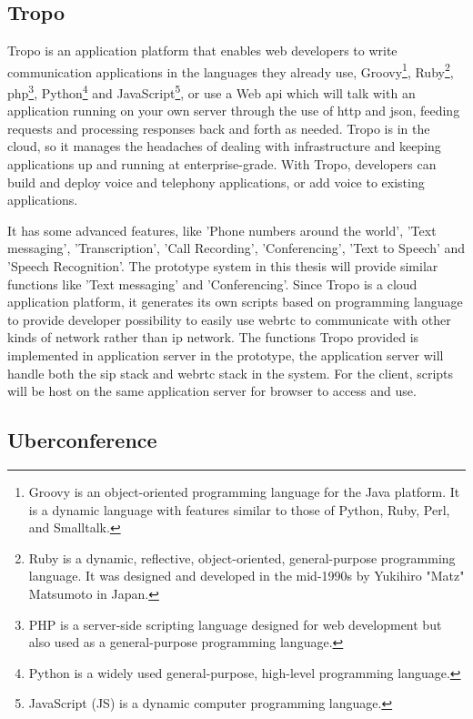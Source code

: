\subsection{Tropo}

\par Tropo is an application platform that enables web developers to write communication applications in the languages they already use, Groovy\footnote{Groovy is an object-oriented programming language for the Java platform. It is a dynamic language with features similar to those of Python, Ruby, Perl, and Smalltalk.\cite{wiki:groovy}}, Ruby\footnote{Ruby is a dynamic, reflective, object-oriented, general-purpose programming language. It was designed and developed in the mid-1990s by Yukihiro "Matz" Matsumoto in Japan.\cite{wiki:ruby}}, \gls{php}\footnote{PHP is a server-side scripting language designed for web development but also used as a general-purpose programming language.\cite{wiki:php}}, Python\footnote{Python is a widely used general-purpose, high-level programming language.\cite{wiki:python}} and JavaScript\footnote{JavaScript (JS) is a dynamic computer programming language.\cite{wiki:js}}, or use a Web \gls{api} which will talk with an application running on your own server through the use of \gls{http} and \gls{json}, feeding requests and processing responses back and forth as needed. Tropo is in the cloud, so it manages the headaches of dealing with infrastructure and keeping applications up and running at enterprise-grade. With Tropo, developers can build and deploy voice and telephony applications, or add voice to existing applications.\cite{web:tropo}

\par It has some advanced features, like 'Phone numbers around the world', 'Text messaging', 'Transcription', 'Call Recording', 'Conferencing', 'Text to Speech' and 'Speech Recognition'. The prototype system in this thesis will provide similar functions like 'Text messaging' and 'Conferencing'. Since Tropo is a cloud application platform, it generates its own scripts based on programming language to provide developer possibility to easily use \gls{webrtc} to communicate with other kinds of network rather than \gls{ip} network. The functions Tropo provided is implemented in application server in the prototype, the application server will handle both the \gls{sip} stack and \gls{webrtc} stack in the system. For the client, scripts will be host on the same application server for browser to access and use.

\subsection{Uberconference}

